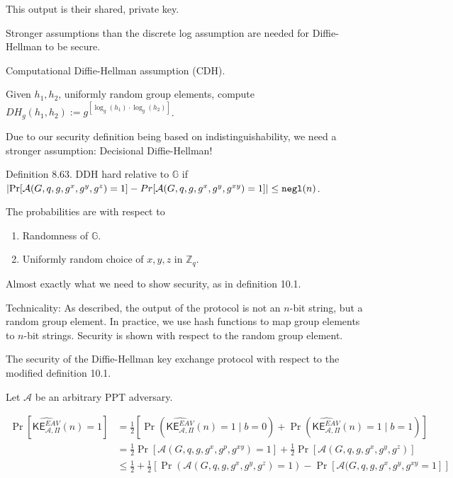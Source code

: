 \documentclass[12pt]{article}
\newcommand{\Z}{\mathbb{Z}}
\newcommand{\G}{\mathbb{G}}
\newcommand{\AAA}{\mathcal{A}}
\newcommand{\ExptKEArgs}[3]{\mathsf{KE}_{#1,#2}^{#3}}
\newcommand{\ExptKE}{\ExptKEArgs{\AAA}{\Pi}{EAV}}
\newcommand{\negl}{{\tt negl}}
\begin{document}
This output is their shared, private key.

Stronger assumptions than the discrete log assumption are needed for Diffie-Hellman to be secure.

Computational Diffie-Hellman assumption (CDH).

Given $h_1,h_2$, uniformly random group elements, compute $DH_g(h_1,h_2):=g^{[\log_g(h_1)\cdot\log_g(h_2)]}$.

Due to our security definition being based on indistinguishability, we need a stronger assumption: Decisional Diffie-Hellman!

Definition 8.63. DDH hard relative to $\G$ if $\left|\Pr[\AAA(G,q,g,g^x,g^y,g^z)=1]-Pr[\AAA(G,q,g,g^x,g^y,g^{xy})=1]\right|\leq\negl(n)$.

The probabilities are with respect to\begin{enumerate}

\item Randomness of $\G$.

\item Uniformly random choice of $x,y,z$ in $\Z_q$.

\end{enumerate}

Almost exactly what we need to show security, as in definition 10.1.

Technicality: As described, the output of the protocol is not an $n$-bit string, but a random group element. In practice, we use hash functions to map group elements to $n$-bit strings. Security is shown with respect to the random group element.

The security of the Diffie-Hellman key exchange protocol with respect to the modified definition 10.1.

Let $\AAA$ be an arbitrary PPT adversary.

\begin{align*}
\Pr[\hat{\ExptKE}(n)=1]&=\frac{1}{2}[\Pr(\hat{\ExptKE}(n)=1\mid b=0)+\Pr(\hat{\ExptKE}(n)=1\mid b=1)]\\
&=\frac{1}{2}\Pr[\AAA(G,q,g,g^x,g^p,g^{xy})=1]+\frac{1}{2}\Pr[\AAA(G,q,g,g^x,g^y,g^z)]\\
&\leq\frac{1}{2}+\frac{1}{2}[\Pr(\AAA(G,q,g,g^x,g^y,g^z)=1)-\Pr[\AAA(G,q,g,g^x,g^y,g^{xy}=1]]
\end{align*}
\end{document}
